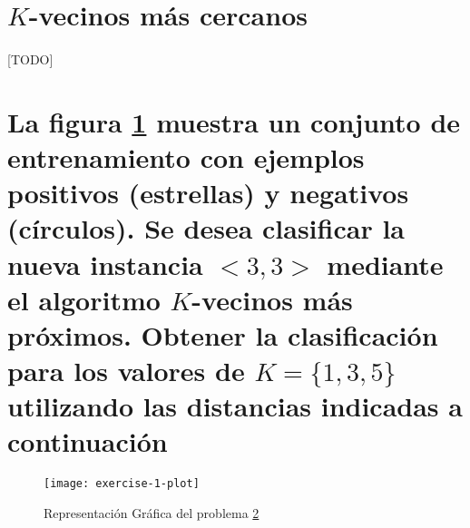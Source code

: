 \documentclass{article}
\begin{document}
	\maketitle %

	\thispagestyle{fancy} %



	\begin{abstract}
		\noindent En este documento se describe la estrategia de clasificación supervisada basada en instancias del algoritmo \emph{K-NN}. También se describen las medidas de distancia utilizadas comunmente por los algoritmos de aprendizaje que se apoyan en dicha estrategia. Por último, se realizan dos casos de prueba que demuestran, el funcionamiento de dicho clasificicador en la sección \ref{sec:e1}, y las bondades a nivel de resultados así como la necesidad de ajuste de parámetros en la sección \ref{sec:e2}.
	\end{abstract}



	\section{$K$-vecinos más cercanos}

		\paragraph{}
		[TODO]

	\section{La figura \ref{e1:plot} muestra un conjunto de entrenamiento con ejemplos positivos (estrellas) y negativos (círculos). Se desea clasificar la nueva instancia $<3,3>$ mediante el algoritmo $K$-vecinos más próximos. Obtener la clasificación para los valores de $K=\{ 1, 3, 5\}$ utilizando las distancias indicadas a continuación}
	\label{sec:e1}

		\begin{figure}
			\begin{center}
				\texttt{[image: exercise-1-plot]}
			\end{center}
			\caption{Representación Gráfica del problema \ref{sec:e1}}
			\label{e1:plot}
		\end{figure}
\end{document}
